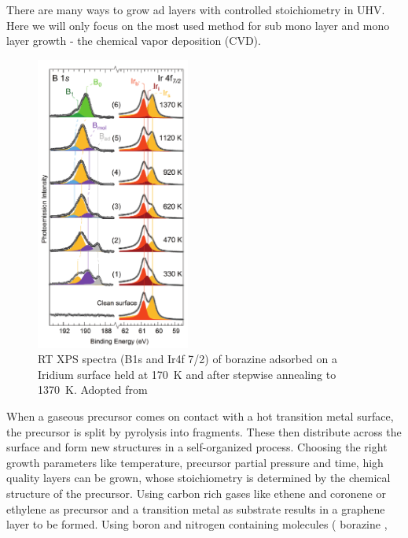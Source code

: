 	There are many ways to grow ad layers with controlled stoichiometry in UHV. Here we will only focus on the most used method for sub mono layer and mono layer growth - the chemical vapor deposition (CVD). 
	\begin{figure}\centering
		\includegraphics[width=0.45\textwidth]{./images/07571n_fig5.png}
		\caption{RT XPS spectra (B1s and Ir4f 7/2) of borazine adsorbed on a Iridium surface held at \SI{170}{\kelvin} and after stepwise annealing to \SI{1370}{\kelvin}. Adopted from \cite{orlando_epitaxial_2012}}
		\label{fig:borazine-TPG-on-Ir}
	\end{figure}
	When a gaseous precursor comes on contact with a hot transition metal surface, the precursor is split by pyrolysis into fragments. These then distribute across the surface and form new structures in a self-organized process. Choosing the right growth parameters like temperature, precursor partial pressure and time, high quality layers can be grown, whose stoichiometry is determined by the chemical structure of the precursor. Using carbon rich gases like ethene and coronene \cite{coraux_growth_2009} or ethylene \cite{ndiaye_structure_2008-1} as precursor and a transition metal as substrate results in a graphene layer to be formed. Using boron and nitrogen containing molecules (
	borazine \cite{muller_epitaxial_2010, joshi_boron_2012, schwarz_corrugation_2017, li_grain_2015, preobrajenski_monolayer_2005, auwarter_xpd_1999, morscher_formation_2006, preobrajenski_monolayer_2007-1, corso_boron_2004, goriachko_self-assembly_2007, kidambi_situ_2014, kim_synthesis_2012}, 
